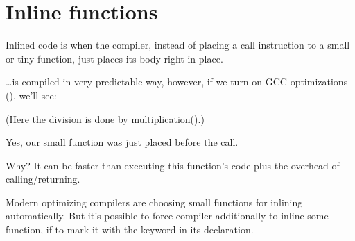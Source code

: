 \section{Inline functions}
\label{inline_code}

Inlined code is when the compiler, instead of placing a call instruction to a small or tiny function,
just places its body right in-place.



\dots is compiled in very predictable way, however, if we turn on GCC optimizations (\Othree), we'll see:



(Here the division is done by multiplication().)

Yes, our small function  was just placed before the \printf call.

Why? It can be faster than executing this function's code plus the overhead of calling/returning.

Modern optimizing compilers are choosing small functions for inlining automatically.
But it's possible to force compiler additionally to inline some function, if to mark
it with the  keyword in its declaration.


